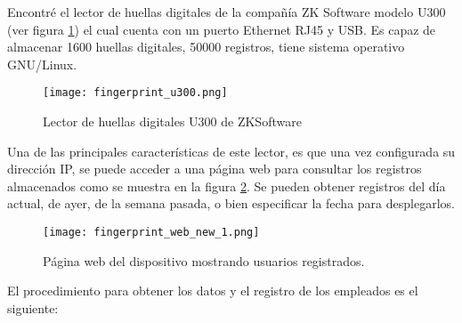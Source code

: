 Encontré el lector de huellas digitales de la compañía ZK Software modelo U300 (ver figura \ref{fig:finger_print_7}) el cual cuenta con un puerto Ethernet RJ45 y USB. Es capaz de almacenar 1600 huellas digitales, 50000 registros, tiene sistema operativo GNU/Linux.

\begin{figure}[htb]
 \begin{center}
  \texttt{[image: fingerprint\_u300.png]}
 \end{center}
 \caption{Lector de huellas digitales U300 de ZKSoftware}
 \label{fig:finger_print_7}
\end{figure}

Una de las principales características de este lector, es que una vez configurada su dirección IP, se puede acceder a una página web para consultar los registros almacenados como se muestra en la figura \ref{fig:finger_print_8}. Se pueden obtener registros del día actual, de ayer, de la semana pasada, o bien especificar la fecha para desplegarlos. 

\begin{figure}[htb]
 \begin{center}
  \texttt{[image: fingerprint\_web\_new\_1.png]}
 \end{center}
 \caption{Página web del dispositivo mostrando usuarios registrados.}
 \label{fig:finger_print_8}
\end{figure}

El procedimiento para obtener los datos y el registro de los empleados es el siguiente:

